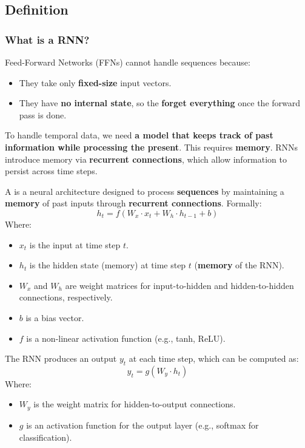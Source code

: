 \subsection{Definition}\label{sec:rnn-definition}

\subsubsection{What is a RNN?}

Feed-Forward Networks (FFNs) cannot handle sequences because:
\begin{itemize}
    \item They take only \textbf{fixed-size} input vectors.
    \item They have \textbf{no internal state}, so the \textbf{forget everything} once the forward pass is done.
\end{itemize}
To handle temporal data, we need \textbf{a model that keeps track of past information while processing the present}. This requires \textbf{memory}. RNNs introduce memory via \textbf{recurrent connections}, which allow information to persist across time steps.

\highspace
\begin{definitionbox}\label{def:rnn}
    A  is a neural architecture designed to process \textbf{sequences} by maintaining a \textbf{memory} of past inputs through \textbf{recurrent connections}. Formally:
    \begin{equation}\label{eq:rnn-update}
        h_t = f\left(W_x \cdot x_t + W_h \cdot h_{t-1} + b\right)
    \end{equation}
    Where:
    \begin{itemize}
        \item $x_t$ is the input at time step $t$.
        \item $h_t$ is the hidden state (memory) at time step $t$ (\textbf{memory} of the RNN).
        \item $W_x$ and $W_h$ are weight matrices for input-to-hidden and hidden-to-hidden connections, respectively.
        \item $b$ is a bias vector.
        \item $f$ is a non-linear activation function (e.g., tanh, ReLU).
    \end{itemize}
    The RNN produces an output $y_t$ at each time step, which can be computed as:
    \begin{equation}
        y_t = g\left(W_y \cdot h_t\right)
    \end{equation}
    Where:
    \begin{itemize}
        \item $W_y$ is the weight matrix for hidden-to-output connections.
        \item $g$ is an activation function for the output layer (e.g., softmax for classification).
    \end{itemize}
\end{definitionbox}


